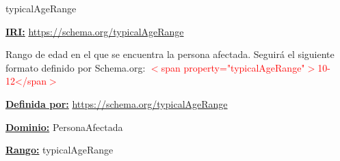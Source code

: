 \begin{mybox}{typicalAgeRange}
\begin{flushleft}
\underline{\textbf{IRI:}}
\url{https://schema.org/typicalAgeRange}
\newline

Rango de edad en el que se encuentra la persona afectada.
\newline Seguirá el siguiente formato definido por Schema.org: 
\newline  \textcolor{red}{ $<$span property="typicalAgeRange"$>$10-12</span$>$ } \cite{schema_typicalAgeRange}
\newline

\underline{\textbf{Definida por:}}
\url{https://schema.org/typicalAgeRange}
\newline

\underline{\textbf{Dominio:}} 
\newline PersonaAfectada
\newline

\underline{\textbf{Rango:}}
\newline typicalAgeRange
\newline

\end{flushleft}
\end{mybox}



